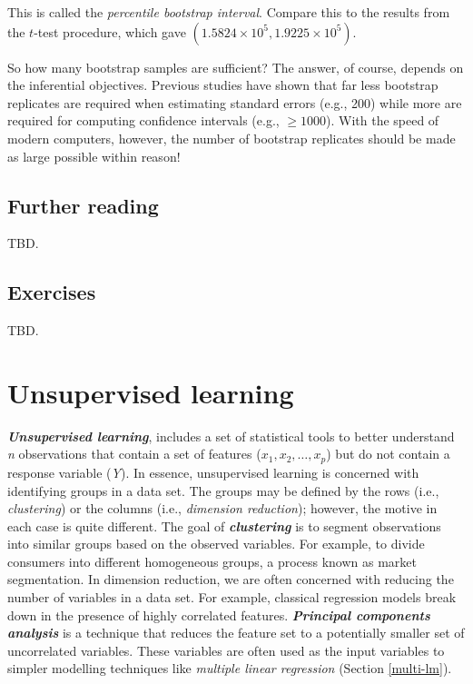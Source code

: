 \documentclass[]{book}
\newenvironment{Shaded}{\begin{snugshade}}{\end{snugshade}}
\newcommand{\DataTypeTok}[1]{\textcolor[rgb]{0.13,0.29,0.53}{#1}}
\newcommand{\FloatTok}[1]{\textcolor[rgb]{0.00,0.00,0.81}{#1}}
\newcommand{\KeywordTok}[1]{\textcolor[rgb]{0.13,0.29,0.53}{\textbf{#1}}}
\newcommand{\NormalTok}[1]{#1}
\newcommand{\OperatorTok}[1]{\textcolor[rgb]{0.81,0.36,0.00}{\textbf{#1}}}
\theoremstyle{definition}
\theoremstyle{definition}
\theoremstyle{definition}
\theoremstyle{remark}
\begin{document}
\begin{Shaded}
\end{Shaded}

This is called the \emph{percentile bootstrap interval}. Compare this to
the results from the \(t\)-test procedure, which gave
\(\left(1.5824\times 10^{5}, 1.9225\times 10^{5}\right)\).

So how many bootstrap samples are sufficient? The answer, of course,
depends on the inferential objectives. Previous studies have shown that
far less bootstrap replicates are required when estimating standard
errors (e.g., 200) while more are required for computing confidence
intervals (e.g., \(\ge 1000\)). With the speed of modern computers,
however, the number of bootstrap replicates should be made as large
possible within reason!

\hypertarget{further-reading-1}{%
\section{Further reading}\label{further-reading-1}}

TBD.

\hypertarget{exercises-2}{%
\section{Exercises}\label{exercises-2}}

TBD.

\hypertarget{unsupervised}{%
\chapter{Unsupervised learning}\label{unsupervised}}

\textbf{\emph{Unsupervised learning}}, includes a set of statistical
tools to better understand \emph{n} observations that contain a set of
features (\(x_1, x_2, \dots, x_p\)) but do not contain a response
variable (\emph{Y}). In essence, unsupervised learning is concerned with
identifying groups in a data set. The groups may be defined by the rows
(i.e., \emph{clustering}) or the columns (i.e., \emph{dimension
reduction}); however, the motive in each case is quite different. The
goal of \textbf{\emph{clustering}} is to segment observations into
similar groups based on the observed variables. For example, to divide
consumers into different homogeneous groups, a process known as market
segmentation. In dimension reduction, we are often concerned with
reducing the number of variables in a data set. For example, classical
regression models break down in the presence of highly correlated
features. \textbf{\emph{Principal components analysis}} is a technique
that reduces the feature set to a potentially smaller set of
uncorrelated variables. These variables are often used as the input
variables to simpler modelling techniques like \emph{multiple linear
regression} (Section \ref{multi-lm}).
\end{document}
